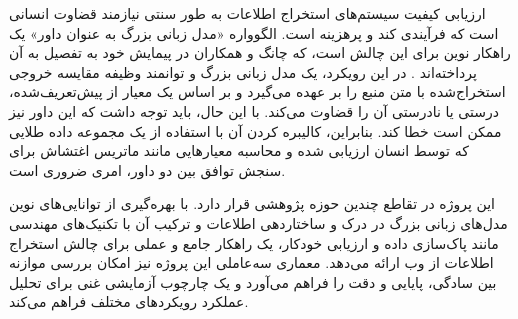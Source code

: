 
ارزیابی کیفیت سیستم‌های استخراج اطلاعات به طور سنتی نیازمند قضاوت انسانی است که فرآیندی کند و پرهزینه است. الگوواره «مدل زبانی بزرگ به عنوان داور» یک راهکار نوین برای این چالش است، که چانگ و همکاران در پیمایش خود به تفصیل به آن پرداخته‌اند \cite{chang2023survey}. در این رویکرد، یک مدل زبانی بزرگ و توانمند وظیفه مقایسه خروجی استخراج‌شده با متن منبع را بر عهده می‌گیرد و بر اساس یک معیار از پیش‌تعریف‌شده، درستی یا نادرستی آن را قضاوت می‌کند. با این حال، باید توجه داشت که این داور نیز ممکن است خطا کند. بنابراین، کالیبره کردن آن با استفاده از یک مجموعه داده طلایی که توسط انسان ارزیابی شده و محاسبه معیارهایی مانند ماتریس اغتشاش برای سنجش توافق بین دو داور، امری ضروری است.


این پروژه در تقاطع چندین حوزه پژوهشی قرار دارد. با بهره‌گیری از توانایی‌های نوین مدل‌های زبانی بزرگ در درک و ساختاردهی اطلاعات و ترکیب آن با تکنیک‌های مهندسی مانند پاک‌سازی داده و ارزیابی خودکار، یک راهکار جامع و عملی برای چالش استخراج اطلاعات از وب ارائه می‌دهد. معماری سه‌عاملی این پروژه نیز امکان بررسی موازنه بین سادگی، پایایی و دقت را فراهم می‌آورد و یک چارچوب آزمایشی غنی برای تحلیل عملکرد رویکردهای مختلف فراهم می‌کند.
